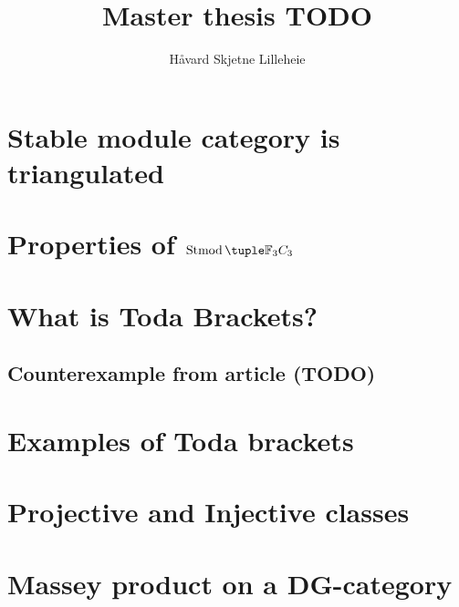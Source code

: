 \documentclass[a4paper, 12pt]{article}
\title{Master thesis TODO}
\author{Håvard Skjetne Lilleheie}
\begin{document}
\maketitle

\tableofcontents

\section{Stable module category is triangulated}


\section{Properties of \texorpdfstring{\( \Stmod{\Fb_3 C_3} \)}{Stmod(F\_3C\_3)}} 


\section{What is Toda Brackets?}


\subsection{Counterexample from article (TODO)}


\section{Examples of Toda brackets}


\section{Projective and Injective classes}


\section{Massey product on a DG-category}


{}

\end{document}
